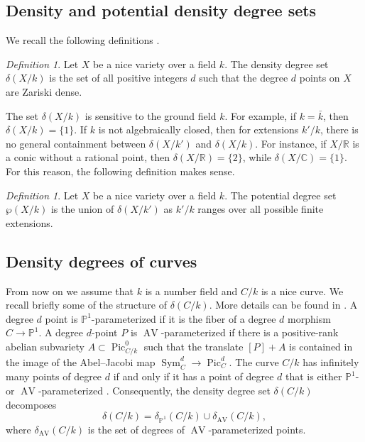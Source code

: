 \documentclass[a4paper,11pt]{amsart}
\theoremstyle{plain}
\theoremstyle{remark}
\newtheorem{defn}[thm]{Definition}
\DeclareMathOperator{\Sym}{Sym}
\newcommand{\bR}{\mathbb{R}}
\newcommand{\Pic}{\operatorname{Pic}}
\newcommand{\dendegs}{\delta}
\newcommand{\AV}{\operatorname{AV}}
\begin{document}
\subsection{Density and potential density degree sets}\label{densitybackground} We recall the following definitions \cite[Definitions 1.2.1, 1.2.3]{VV}. 
\begin{defn}
    Let $X$ be a nice variety over a field $k$. The density degree set $\dendegs(X/k)$ is the set of all positive integers $d$ such that the degree $d$ points on $X$ are Zariski dense. 
\end{defn}
The set $\dendegs(X/k)$ is sensitive to the ground field $k$. For example, if $k=\bar{k}$, then $\dendegs(X/k)=\{1\}.$ If $k$ is not algebraically closed, then for extensions $k'/k$, there is no general containment between $\dendegs(X/k')$ and $\dendegs(X/k).$ For instance, if $X/\bR$ is a conic without a rational point, then $\dendegs(X/\mathbb{R})=\{2\}$, while $\dendegs(X/\mathbb{C})=\{1\}$. For this reason, the following definition makes sense.
\begin{defn}\label{def:potentialdensity}
    Let $X$ be a nice variety over a field $k.$ The potential degree set $\wp(X/k)$ is the union of $\dendegs(X/k')$ as $k'/k$ ranges over all possible finite extensions.
\end{defn}
\subsection{Density degrees of curves}
From now on we assume that $k$ is a number field and \(C/k\) is a nice curve. We recall briefly some of the structure of \(\dendegs(C/k)\).  More details can be found in \cite{VV}.  A degree \(d\) point is \(\mathbb{P}^1\)-parameterized if it is the fiber of a degree \(d\) morphism \(C \to \mathbb{P}^1\).  A degree \(d\)-point \(P\) is \(\AV\)-parameterized if there is a positive-rank abelian subvariety \(A \subset \Pic^0_{C/k}\) such that the translate \([P] + A\) is contained in the image of the Abel--Jacobi map \(\Sym^d_C \to \Pic^d_C\).  The curve \(C/k\) has infinitely many points of degree \(d\) if and only if it has a point of degree \(d\) that is either \(\mathbb{P}^1\)- or \(\AV\)-parameterized \cite[Theorem 4.4.3]{VV}.  Consequently,
the density degree set $\dendegs(C/k)$ decomposes
\[\dendegs(C/k)=\dendegs_{\mathbb{P}^1}(C/k)\cup\dendegs_{\AV}(C/k),\]
where $\dendegs_{\AV}(C/k)$ is the set of degrees of \(\AV\)-parameterized points\cite[Corollary 5.0.1, Definition 5.0.2]{VV}.
\end{document}
